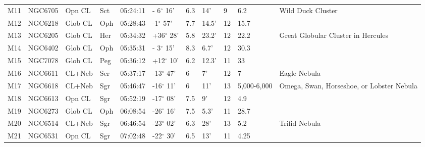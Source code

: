 \documentclass[10pt,twoside,a4paper,english]{article}
\begin{document}
\begin{longtable}{@{}lllllllllll@{}}
M11        & NGC6705     & Opn CL     & Sct       & 05:24:11 & - 6$^{\circ}$ 16'  & 6.3       & 14'                  & 9        & 6.2                 & Wild Duck Cluster                         \\ 
M12        & NGC6218     & Glob CL    & Oph       & 05:28:43 & -1$^{\circ}$ 57'   & 7.7       & 14.5'                & 12       & 15.7                &                                           \\ 
M13        & NGC6205     & Glob CL    & Her       & 05:34:32 & +36$^{\circ}$ 28'  & 5.8       & 23.2'                & 12       & 22.2                & Great Globular Cluster in Hercules        \\ 
M14        & NGC6402     & Glob CL    & Oph       & 05:35:31 & - 3$^{\circ}$ 15'  & 8.3       & 6.7'                 & 12       & 30.3                &                                           \\ 
M15        & NGC7078     & Glob CL    & Peg       & 05:36:12 & +12$^{\circ}$ 10'  & 6.2       & 12.3'                & 11       & 33                  &                                           \\ 
M16        & NGC6611     & CL+Neb     & Ser       & 05:37:17 & -13$^{\circ}$ 47'  & 6         & 7'                   & 12       & 7                   & Eagle Nebula                              \\ 
M17        & NGC6618     & CL+Neb     & Sgr       & 05:46:47 & -16$^{\circ}$ 11'  & 6         & 11'                  & 13       & 5,000-6,000         & Omega, Swan, Horseshoe, or Lobster Nebula \\ 
M18        & NGC6613     & Opn CL     & Sgr       & 05:52:19 & -17$^{\circ}$ 08'  & 7.5       & 9'                   & 12       & 4.9                 &                                           \\ 
M19        & NGC6273     & Glob CL    & Oph       & 06:08:54 & -26$^{\circ}$ 16'  & 7.5       & 5.3'                 & 11       & 28.7                &                                           \\ 
M20        & NGC6514     & CL+Neb     & Sgr       & 06:46:54 & -23$^{\circ}$ 02'  & 6.3       & 28'                  & 13       & 5.2                 & Trifid Nebula                             \\ 
M21        & NGC6531     & Opn CL     & Sgr       & 07:02:48 & -22$^{\circ}$ 30'  & 6.5       & 13'                  & 11       & 4.25                &                                           \\ 

\end{longtable}
\end{document}
